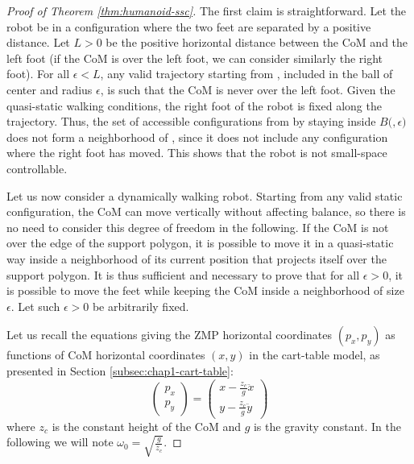 \begin{proof}[Proof of Theorem \ref{thm:humanoid-ssc}]

The first claim is straightforward. Let the robot be in a
configuration \config{} where the two feet are separated by a positive
distance. Let $L>0$ be the positive horizontal distance between the
CoM and the left foot (if the CoM is over the left foot, we can
consider similarly the right foot). For all $\epsilon < L$, any valid
trajectory starting from \config{}, included in the ball of center
\config{} and radius $\epsilon$, is such that the CoM is never over
the left foot.  Given the quasi-static walking conditions, the right
foot of the robot is fixed along the trajectory. Thus, the set of
accessible configurations from \config{} by staying inside
$B($\config{}$,\epsilon)$ does not form a neighborhood of \config{},
since it does not include any configuration where the right foot has
moved. This shows that the robot is not small-space controllable.

\bigskip

Let us now consider a dynamically walking robot. Starting from any
valid static configuration, the CoM can move vertically without
affecting balance, so there is no need to consider this degree of
freedom in the following. If the CoM is not over the edge of the
support polygon, it is possible to move it in a quasi-static way
inside a neighborhood of its current position that projects itself
over the support polygon.  It is thus sufficient and necessary to
prove that for all $\epsilon >0$, it is possible to move the feet
while keeping the CoM inside a neighborhood of size $\epsilon$. Let
such $\epsilon >0$ be arbitrarily fixed.

Let us recall the equations giving the ZMP horizontal coordinates
$(p_x,p_y)$ as functions of CoM horizontal coordinates $(x,y)$ in the
cart-table model, as presented in Section
\ref{subsec:chap1-cart-table}:
\begin{equation}
\label{eq:walk-zmp}
\left(
\begin{array}{c}
p_x\\ p_y
\end{array}
\right) = \displaystyle \left(
\begin{array}{c}
x - \frac{z_c}{g} \ddot{x}\\ y - \frac{z_c}{g} \ddot{y}
\end{array}
\right)
\end{equation}
where $z_c$ is  the constant height of the CoM and  $g$ is the gravity
constant.    In    the    following    we    will    note    $\omega_0
=\sqrt{\frac{g}{z_c}}$.


\end{proof}
